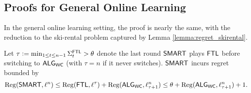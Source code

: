 
\subsection{Proofs for General Online Learning}

In the general online learning setting, the proof is nearly the same, with the reduction to the ski-rental problem captured by Lemma \ref{lemma:regret_skirental}.
\begin{lemma} \label{lemma:regret_skirental}
Let $\tau \mathrel{\mathop{:}}= \min_{1 \le t \le n-1} \Sigma^{\mathsf{FTL}}_t > \theta$ denote the last round $\mathsf{SMART}$ plays $\mathsf{FTL}$ before switching to $\mathsf{ALG}_{\mathsf{WC}}$ (with $\tau=n$ if it never switches). $\mathsf{SMART}$ incurs regret bounded by
\[\mathrm{Reg}(\mathsf{SMART}, \ell^n) \leq \mathrm{Reg}(\mathsf{FTL}, \ell^{\tau}) + \mathrm{Reg}(\mathsf{ALG}_{\mathsf{WC}}, \ell_{\tau+1}^n) \leq \theta + \mathrm{Reg}(\mathsf{ALG}_{\mathsf{WC}}, \ell_{\tau+1}^n) + 1.\]
\end{lemma}

